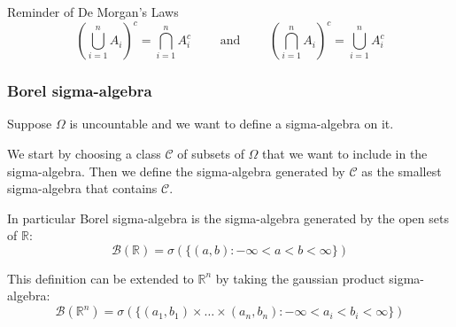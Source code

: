 \documentclass[10pt]{extarticle}
\newcommand{\R}{\mathbb{R}}
\begin{document}
\begin{notebox}{Reminder of De Morgan's Laws}
    $$
        \left(\bigcup_{i=1}^n A_i\right)^c = \bigcap_{i=1}^n A_i^c
        \qquad \text{ and } \qquad
        \left(\bigcap_{i=1}^n A_i\right)^c = \bigcup_{i=1}^n A_i^c
    $$
\end{notebox}

\subsubsection{Borel sigma-algebra}

Suppose $\Omega$ is uncountable and we want to define a sigma-algebra on it.

We start by choosing a class $\mathcal C$ of subsets of $\Omega$ that we want to include in the sigma-algebra.
Then we define the sigma-algebra generated by $\mathcal C$ as the smallest sigma-algebra that contains $\mathcal C$.

In particular Borel sigma-algebra is the sigma-algebra generated by the open sets of $\R$:
$$
    \mathcal B (\R) = \sigma(\{(a, b) : -\infty < a < b < \infty\})
$$

This definition can be extended to $\R^n$ by taking the gaussian product sigma-algebra:
$$
    \mathcal B (\R^n) = \sigma(\{(a_1, b_1) \times \dots \times (a_n, b_n) : -\infty < a_i < b_i < \infty\})
$$
\end{document}
